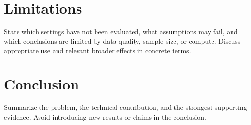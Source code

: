 \section{Limitations}\label{sec:limitations}
State which settings have not been evaluated, what assumptions may fail,
and which conclusions are limited by data quality, sample size, or compute.
Discuss appropriate use and relevant broader effects in concrete terms.

\section{Conclusion}\label{sec:conclusion}
Summarize the problem, the technical contribution, and the strongest supporting
evidence. Avoid introducing new results or claims in the conclusion.
